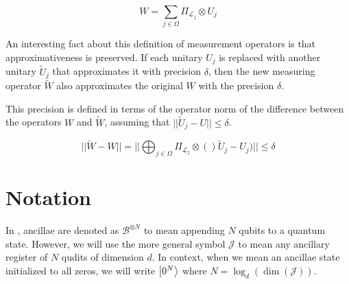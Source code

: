 \begin{equation}
W = \sum_{j \in \Omega} \Pi_{\mathcal{L}_j} \otimes U_j
\end{equation}

An interesting fact about this definition of measurement operators is
that approximativeness is preserved. If each unitary $U_j$ is replaced with
another unitary $\tilde{U}_j$ that approximates it with precision $\delta$,
then the new measuring operator $\tilde{W}$ also approximates the original
$W$ with the precision $\delta$.

This precision is defined in terms of the operator norm of the difference
between the operators $W$ and $\tilde{W}$, assuming that
$|| \tilde{U}_j - U || \le \delta$.

\begin{equation}
|| \tilde{W} - W || = || \bigoplus_{j \in \Omega} \Pi_{\mathcal{L}_j} \otimes () \tilde{U}_j - U_j ) || \le \delta
\end{equation}

\section{Notation}
\label{sec:meas-notation}

In \cite{Kitaev2002}, ancillae are denoted as $\mathcal{B}^{\otimes N}$ to mean
appending $N$ qubits to a quantum state. However, we will use the more general
symbol $\mathcal{J}$ to mean any ancillary register of $N$ qudits of dimension $d$.
In context,
when we mean an ancillae state initialized to all zeros, we will write
$\left\vert{0^N}\right\rangle$ where $N = \log_d(\dim(\mathcal{J}))$.

